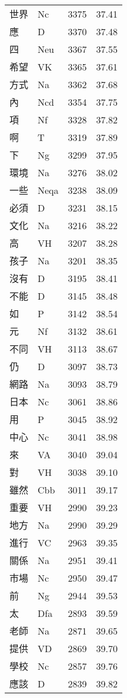 \documentclass[twocolumn]{book}
\begin{document}
\begin{supertabular}{llrr}
世界 & Nc & 3375 &  37.41\\
應 & D & 3370 &  37.48\\
四 & Neu & 3367 &  37.55\\
希望 & VK & 3365 &  37.61\\
方式 & Na & 3362 &  37.68\\
內 & Ncd & 3354 &  37.75\\
項 & Nf & 3328 &  37.82\\
啊 & T & 3319 &  37.89\\
下 & Ng & 3299 &  37.95\\
環境 & Na & 3276 &  38.02\\
一些 & Neqa & 3238 &  38.09\\
必須 & D & 3231 &  38.15\\
文化 & Na & 3216 &  38.22\\
高 & VH & 3207 &  38.28\\
孩子 & Na & 3201 &  38.35\\
沒有 & D & 3195 &  38.41\\
不能 & D & 3145 &  38.48\\
如 & P & 3142 &  38.54\\
元 & Nf & 3132 &  38.61\\
不同 & VH & 3113 &  38.67\\
仍 & D & 3097 &  38.73\\
網路 & Na & 3093 &  38.79\\
日本 & Nc & 3061 &  38.86\\
用 & P & 3045 &  38.92\\
中心 & Nc & 3041 &  38.98\\
來 & VA & 3040 &  39.04\\
對 & VH & 3038 &  39.10\\
雖然 & Cbb & 3011 &  39.17\\
重要 & VH & 2990 &  39.23\\
地方 & Na & 2990 &  39.29\\
進行 & VC & 2963 &  39.35\\
關係 & Na & 2951 &  39.41\\
市場 & Nc & 2950 &  39.47\\
前 & Ng & 2944 &  39.53\\
太 & Dfa & 2893 &  39.59\\
老師 & Na & 2871 &  39.65\\
提供 & VD & 2869 &  39.70\\
學校 & Nc & 2857 &  39.76\\
應該 & D & 2839 &  39.82\\

\end{supertabular}
\end{document}

